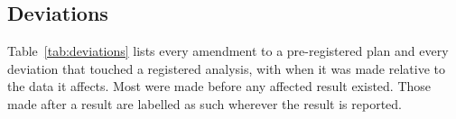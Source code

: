 \subsection{Deviations}
\label{sec:deviations}

Table~\ref{tab:deviations} lists every amendment to a pre-registered plan and every deviation that touched a
registered analysis, with when it was made relative to the data it affects.
Most were made before any affected result existed.
Those made after a result are labelled as such wherever the result is reported.


